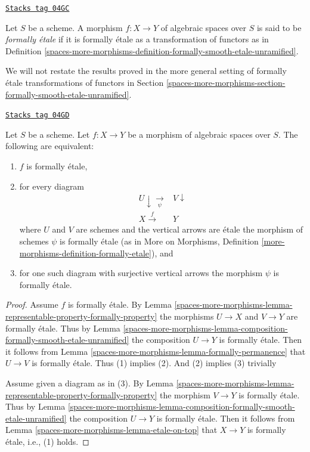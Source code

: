 \begin{definition}
\label{spaces-more-morphisms-definition-formally-etale}
\href{https://stacks.math.columbia.edu/tag/04GC}{\texttt{Stacks tag 04GC}}

Let $S$ be a scheme. A morphism $f : X \to Y$ of algebraic spaces over $S$
is said to be {\it formally \'etale} if it is formally \'etale as a
transformation of functors as in
Definition \ref{spaces-more-morphisms-definition-formally-smooth-etale-unramified}.
\end{definition}

We will not restate the results proved in the more general setting of
formally \'etale transformations of functors in
Section \ref{spaces-more-morphisms-section-formally-smooth-etale-unramified}.

\begin{lemma}
\label{spaces-more-morphisms-lemma-formally-etale}
\href{https://stacks.math.columbia.edu/tag/04GD}{\texttt{Stacks tag 04GD}}

Let $S$ be a scheme. Let $f : X \to Y$ be a morphism of algebraic spaces over
$S$. The following are equivalent:
\begin{enumerate}
\item $f$ is formally \'etale,
\item for every diagram
$$
\begin{array}{cc}U \downarrow\underset{\psi}{\longrightarrow} & V \downarrow \\ X \overset{f}{\longrightarrow} & Y\end{array}
$$
where $U$ and $V$ are schemes and the vertical arrows are \'etale
the morphism of schemes $\psi$ is formally \'etale (as in
More on Morphisms,
Definition \ref{more-morphisms-definition-formally-etale}), and
\item for one such diagram with surjective vertical arrows the morphism
$\psi$ is formally \'etale.
\end{enumerate}
\end{lemma}

\begin{proof}
Assume $f$ is formally \'etale. By
Lemma \ref{spaces-more-morphisms-lemma-representable-property-formally-property}
the morphisms $U \to X$ and $V \to Y$ are formally \'etale. Thus by
Lemma \ref{spaces-more-morphisms-lemma-composition-formally-smooth-etale-unramified}
the composition $U \to Y$ is formally \'etale. Then it follows from
Lemma \ref{spaces-more-morphisms-lemma-formally-permanence}
that $U \to V$ is formally \'etale. Thus (1) implies (2). And (2)
implies (3) trivially

\medskip\noindent
Assume given a diagram as in (3). By
Lemma \ref{spaces-more-morphisms-lemma-representable-property-formally-property}
the morphism $V \to Y$ is formally \'etale. Thus by
Lemma \ref{spaces-more-morphisms-lemma-composition-formally-smooth-etale-unramified}
the composition $U \to Y$ is formally \'etale. Then it follows from
Lemma \ref{spaces-more-morphisms-lemma-etale-on-top}
that $X \to Y$ is formally \'etale, i.e., (1) holds.
\end{proof}


